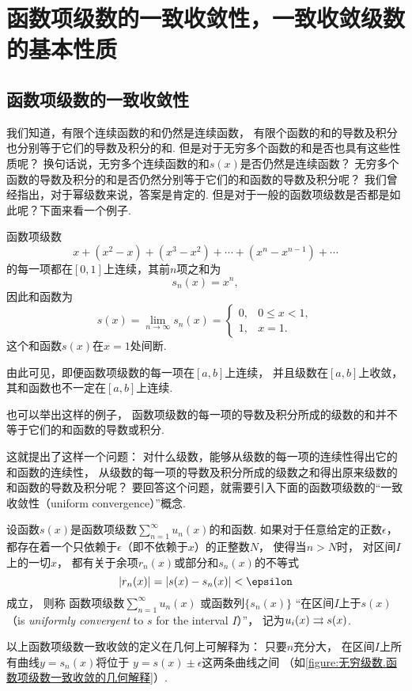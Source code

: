 \section{函数项级数的一致收敛性，一致收敛级数的基本性质}

\subsection{函数项级数的一致收敛性}
我们知道，有限个连续函数的和仍然是连续函数，
有限个函数的和的导数及积分也分别等于它们的导数及积分的和.
但是对于无穷多个函数的和是否也具有这些性质呢？
换句话说，无穷多个连续函数的和\(s(x)\)是否仍然是连续函数？
无穷多个函数的导数及积分的和是否仍然分别等于它们的和函数的导数及积分呢？
我们曾经指出，对于幂级数来说，答案是肯定的.
但是对于一般的函数项级数是否都是如此呢？下面来看一个例子.
\begin{example}
函数项级数\[
x + (x^2-x) + (x^3-x^2) + \dotsb + (x^n-x^{n-1}) + \dotsb
\]的每一项都在\([0,1]\)上连续，其前\(n\)项之和为\[
s_n(x) = x^n,
\]因此和函数为\[
s(x) = \lim_{n\to\infty} s_n(x)
= \left\{ \begin{array}{ll}
0, & 0 \leq x < 1, \\
1, & x = 1.
\end{array} \right.
\]
这个和函数\(s(x)\)在\(x=1\)处间断.
\end{example}

由此可见，即便函数项级数的每一项在\([a,b]\)上连续，
并且级数在\([a,b]\)上收敛，
其和函数也不一定在\([a,b]\)上连续.

也可以举出这样的例子，
函数项级数的每一项的导数及积分所成的级数的和并不等于它们的和函数的导数或积分.

这就提出了这样一个问题：
对什么级数，能够从级数的每一项的连续性得出它的和函数的连续性，
从级数的每一项的导数及积分所成的级数之和得出原来级数的和函数的导数及积分呢？
要回答这个问题，就需要引入下面的函数项级数的“一致收敛性（uniform convergence）”概念.

\begin{definition}\label{definition:无穷级数.函数项级数的一致收敛性}
设函数\(s(x)\)是函数项级数\(\sum_{n=1}^\infty u_n(x)\)的和函数.
如果对于任意给定的正数\(\epsilon\)，
都存在着一个只依赖于\(\epsilon\)（即不依赖于\(x\)）的正整数\(N\)，
使得当\(n>N\)时，
对区间\(I\)上的一切\(x\)，
都有关于余项\(r_n(x)\)或部分和\(s_n(x)\)的不等式\[
\abs{r_n(x)} = \abs{s(x) - s_n(x)} < \epsilon
\]成立，
则称
函数项级数\(\sum_{n=1}^\infty u_n(x)\)
或函数列\(\{s_n(x)\}\)
“在区间\(I\)上于\(s(x)\)%
（is \emph{uniformly convergent} to \(s\) for the interval \(I\)）”，
记为\(u_i(x) \rightrightarrows s(x)\).
\end{definition}
以上函数项级数一致收敛的定义在几何上可解释为：
只要\(n\)充分大，
在区间\(I\)上所有曲线\(y = s_n(x)\)将位于%
\(y = s(x) \pm \epsilon\)这两条曲线之间%
（如\cref{figure:无穷级数.函数项级数一致收敛的几何解释}）.

